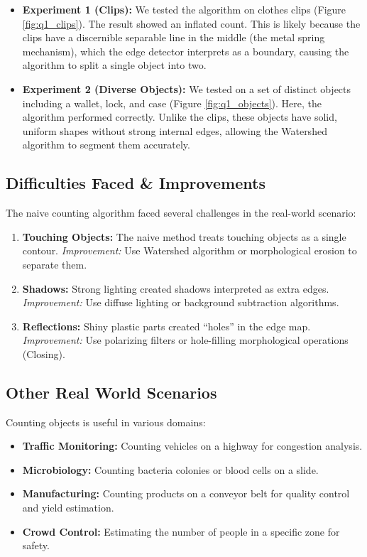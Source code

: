 \documentclass[12pt]{article}
\begin{document}
\begin{itemize}
    \item \textbf{Experiment 1 (Clips):} We tested the algorithm on clothes clips (Figure \ref{fig:q1_clips}). The result showed an inflated count. This is likely because the clips have a discernible separable line in the middle (the metal spring mechanism), which the edge detector interprets as a boundary, causing the algorithm to split a single object into two.
    \item \textbf{Experiment 2 (Diverse Objects):} We tested on a set of distinct objects including a wallet, lock, and case (Figure \ref{fig:q1_objects}). Here, the algorithm performed correctly. Unlike the clips, these objects have solid, uniform shapes without strong internal edges, allowing the Watershed algorithm to segment them accurately.
\end{itemize}

\subsection{Difficulties Faced \& Improvements}
The naive counting algorithm faced several challenges in the real-world scenario:
\begin{enumerate}
    \item \textbf{Touching Objects:} The naive method treats touching objects as a single contour. \textit{Improvement:} Use Watershed algorithm or morphological erosion to separate them.
    \item \textbf{Shadows:} Strong lighting created shadows interpreted as extra edges. \textit{Improvement:} Use diffuse lighting or background subtraction algorithms.
    \item \textbf{Reflections:} Shiny plastic parts created ``holes'' in the edge map. \textit{Improvement:} Use polarizing filters or hole-filling morphological operations (Closing).
\end{enumerate}

\subsection{Other Real World Scenarios}
Counting objects is useful in various domains:
\begin{itemize}
    \item \textbf{Traffic Monitoring:} Counting vehicles on a highway for congestion analysis.
    \item \textbf{Microbiology:} Counting bacteria colonies or blood cells on a slide.
    \item \textbf{Manufacturing:} Counting products on a conveyor belt for quality control and yield estimation.
    \item \textbf{Crowd Control:} Estimating the number of people in a specific zone for safety.
\end{itemize}
\end{document}
